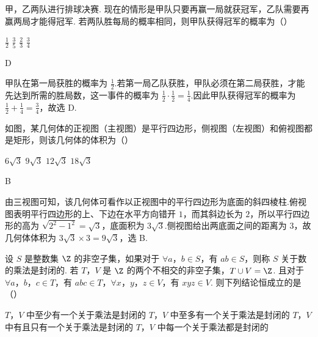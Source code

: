 \begin{problem}
甲，乙两队进行排球决赛. 现在的情形是甲队只要再赢一局就获冠军，乙队需要再赢两局才能得冠军. 若两队胜每局的概率相同，则甲队获得冠军的概率为（\quad）

\choices
    {\(\frac{1}{2}\)}
    {\( \frac{3}{5} \)}
    {\( \frac{2}{3} \)}
    {\( \frac{3}{4} \)}
\end{problem}

\begin{answer}
D
\end{answer}

\begin{solution}
甲队在第一局获胜的概率为 \(\frac{1}{2}\).若第一局乙队获胜，甲队必须在第二局获胜，才能先达到所需的胜局数，这一事件的概率为 \(\frac{1}{2}\cdot\frac{1}{2}=\frac{1}{4}\).因此甲队获得冠军的概率为 \(\frac{1}{2}+\frac{1}{4}=\frac{3}{4}\)，故选 D.
\end{solution}

\begin{problem}
如图，某几何体的正视图（主视图）是平行四边形，侧视图（左视图）和俯视图都是矩形，则该几何体的体积为（\quad）


\choices
    {\(6\sqrt{3}\)}
    {\(9\sqrt{3}\)}
    {\(12\sqrt{3}\)}
    {\(18\sqrt{3}\)}
\end{problem}

\begin{answer}
B
\end{answer}

\begin{solution}
由三视图可知，该几何体可看作以正视图中的平行四边形为底面的斜四棱柱.俯视图表明平行四边形的上、下边在水平方向错开 \(1\)，而其斜边长为 \(2\)，所以平行四边形的高为 \(\sqrt{2^2-1^2}=\sqrt{3}\)，底面积为 \(3\sqrt{3}\).侧视图给出两底面之间的距离为 \(3\)，故几何体体积为 \(3\sqrt{3}\times3=9\sqrt{3}\)，选 B.
\end{solution}

\begin{problem}
设 \(S\) 是整数集 \(\Z\) 的非空子集，如果对于 \(\forall a\)，\(b\in S\)，有 \(ab \in S\)，则称 \(S\) 关于数的乘法是封闭的. 若 \(T\)，\(V\) 是 \(\Z\) 的两个不相交的非空子集，\(T \cup V = \Z\). 且对于 \(\forall a\)，\(b\)，\(c\in T\)，有 \(abc \in T\)，\(\forall x\)，\(y\)，\(z\in V\)，有 \(xyz \in V\). 则下列结论恒成立的是（\quad）

\choices
    {\(T\)，\( V\) 中至少有一个关于乘法是封闭的}
    {\(T\)，\(V\) 中至多有一个关于乘法是封闭的}
    {\(T\)，\(V\) 中有且只有一个关于乘法是封闭的}
    {\(T\)，\(V\) 中每一个关于乘法都是封闭的}
\end{problem}

